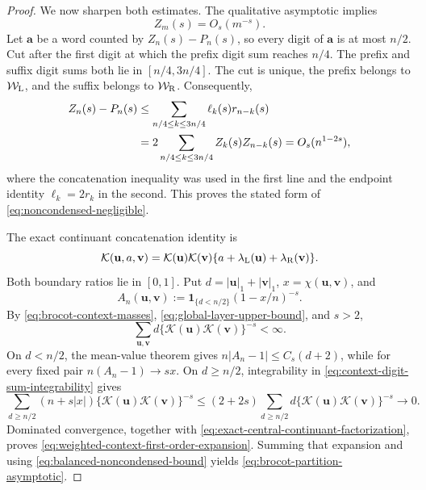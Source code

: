 \begin{proof}
We now sharpen both estimates.  The qualitative asymptotic implies
\begin{equation}
 Z_m(s)=O_s(m^{-s}).
 \label{eq:global-layer-upper-bound}
\end{equation}
Let \(\mathbf a\) be a word counted by \(Z_n(s)-P_n(s)\), so every digit of
\(\mathbf a\) is at most \(n/2\).  Cut after the first digit at which the
prefix digit sum reaches \(n/4\).  The prefix and suffix digit sums both lie
in \([n/4,3n/4]\).  The cut is unique, the prefix belongs to
\(\mathcal W_{\rm L}\), and the suffix belongs to
\(\mathcal W_{\rm R}\).  Consequently,
\begin{align}
 Z_n(s)-P_n(s)
 &\le
 \sum_{n/4\le k\le3n/4}\ell_k(s)r_{n-k}(s)\notag\\
 &=2\sum_{n/4\le k\le3n/4}Z_k(s)Z_{n-k}(s)
 =O_s(n^{1-2s}),
 \label{eq:balanced-noncondensed-bound}
\end{align}
where the concatenation inequality was used in the first line and the
endpoint identity \(\ell_k=2r_k\) in the second.  This proves the stated
form of \eqref{eq:noncondensed-negligible}.

The exact continuant concatenation identity is
\begin{equation}
 \mathcal K(\mathbf u,a,\mathbf v)
 =\mathcal K(\mathbf u)\mathcal K(\mathbf v)
  \{a+\lambda_{\rm L}(\mathbf u)+\lambda_{\rm R}(\mathbf v)\}.
 \label{eq:exact-central-continuant-factorization}
\end{equation}
Both boundary ratios lie in \([0,1]\).  Put
\(d=|\mathbf u|_1+|\mathbf v|_1\),
\(x=\chi(\mathbf u,\mathbf v)\), and
\[
 A_n(\mathbf u,\mathbf v):=
 \mathbf1_{\{d<n/2\}}(1-x/n)^{-s}.
\]
By \eqref{eq:brocot-context-masses},
\eqref{eq:global-layer-upper-bound}, and \(s>2\),
\begin{equation}
 \sum_{\mathbf u,\mathbf v}
 d\{\mathcal K(\mathbf u)\mathcal K(\mathbf v)\}^{-s}<\infty.
 \label{eq:context-digit-sum-integrability}
\end{equation}
On \(d<n/2\), the mean-value theorem gives
\(n|A_n-1|\le C_s(d+2)\), while for every fixed pair
\(n(A_n-1)\to sx\).  On \(d\ge n/2\), integrability in
\eqref{eq:context-digit-sum-integrability} gives
\[
 \sum_{d\ge n/2}(n+s|x|)
 \{\mathcal K(\mathbf u)\mathcal K(\mathbf v)\}^{-s}
 \le(2+2s)\sum_{d\ge n/2}d
 \{\mathcal K(\mathbf u)\mathcal K(\mathbf v)\}^{-s}\longrightarrow0.
\]
Dominated convergence, together with
\eqref{eq:exact-central-continuant-factorization}, proves
\eqref{eq:weighted-context-first-order-expansion}.  Summing that expansion
and using \eqref{eq:balanced-noncondensed-bound} yields
\eqref{eq:brocot-partition-asymptotic}.
\end{proof}

